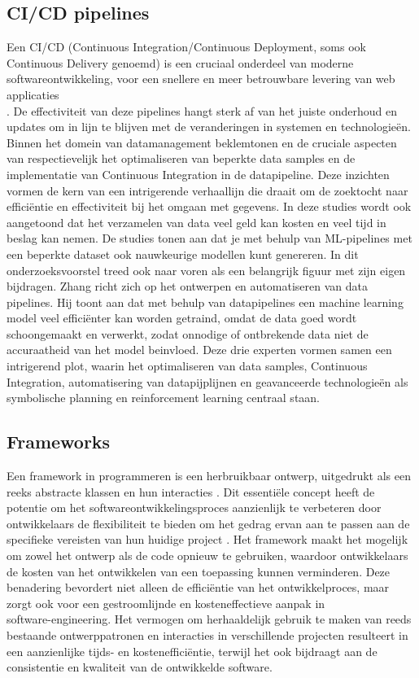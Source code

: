 \subsection{CI/CD pipelines}
Een CI/CD (Continuous Integration/Continuous Deployment, soms ook Continuous Delivery genoemd) is een cruciaal onderdeel van moderne softwareontwikkeling, voor een snellere en meer betrouwbare levering van web applicaties\\ \autocite{Singh2023}.
De effectiviteit van deze pipelines hangt sterk af van het juiste onderhoud en updates om in lijn te blijven met de veranderingen in systemen en technologieën.
Binnen het domein van datamanagement beklemtonen \cite{Samad2018} en \cite{RMV2020} de cruciale aspecten van respectievelijk het optimaliseren van beperkte data samples en de implementatie van Continuous Integration in de datapipeline.
Deze inzichten vormen de kern van een intrigerende verhaallijn die draait om de zoektocht naar efficiëntie en effectiviteit bij het omgaan met gegevens. In deze studies wordt ook aangetoond dat het verzamelen van data veel geld kan kosten en veel tijd in beslag kan nemen. De studies tonen aan dat je met behulp van ML-pipelines met een beperkte dataset ook nauwkeurige modellen kunt genereren.
In dit onderzoeksvoorstel treed ook \cite{Zhang2022} naar voren als een belangrijk figuur met zijn eigen bijdragen.
Zhang richt zich op het ontwerpen en automatiseren van data pipelines. Hij toont aan dat met behulp van datapipelines een machine learning model veel efficiënter kan worden getraind, omdat de data goed wordt schoongemaakt en verwerkt, zodat onnodige of ontbrekende data niet de accuraatheid van het model beinvloed.
Deze drie experten vormen samen een intrigerend plot, waarin het optimaliseren van data samples, Continuous Integration, automatisering van datapijplijnen en geavanceerde technologieën als symbolische planning en reinforcement learning centraal staan. 
\subsection{Frameworks}
Een framework in programmeren is een herbruikbaar ontwerp, uitgedrukt als een reeks abstracte klassen en hun interacties \autocite{JuhaHautamaeki1997}. Dit essentiële concept heeft de potentie om het softwareontwikkelingsproces aanzienlijk te verbeteren door ontwikkelaars de flexibiliteit te bieden om het gedrag ervan aan te passen aan de specifieke vereisten van hun huidige project \autocite{JuhaHautamaeki1997}. Het framework maakt het mogelijk om zowel het ontwerp als de code opnieuw te gebruiken, waardoor ontwikkelaars de kosten van het ontwikkelen van een toepassing kunnen verminderen. Deze benadering bevordert niet alleen de efficiëntie van het ontwikkelproces, maar zorgt ook voor een gestroomlijnde en kosteneffectieve aanpak in \\software-engineering. Het vermogen om herhaaldelijk gebruik te maken van reeds bestaande ontwerppatronen en interacties in verschillende projecten resulteert in een aanzienlijke tijds- en kostenefficiëntie, terwijl het ook bijdraagt aan de consistentie en kwaliteit van de ontwikkelde software.
